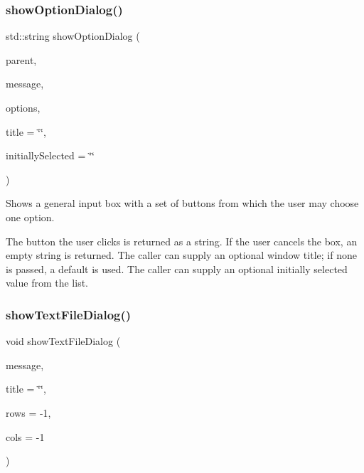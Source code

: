\subsubsection{\texorpdfstring{show\+Option\+Dialog()}{showOptionDialog()}\hspace{0.1cm}{\footnotesize\ttfamily [3/3]}}
{\footnotesize\ttfamily std\+::string show\+Option\+Dialog (\begin{DoxyParamCaption}\item[{Q\+Widget $\ast$}]{parent,  }\item[{const std\+::string \&}]{message,  }\item[{const \mbox{\hyperlink{classVector}{Vector}}$<$ std\+::string $>$ \&}]{options,  }\item[{const std\+::string \&}]{title = {\ttfamily \char`\"{}\char`\"{}},  }\item[{const std\+::string \&}]{initially\+Selected = {\ttfamily \char`\"{}\char`\"{}} }\end{DoxyParamCaption})\hspace{0.3cm}{\ttfamily [static]}}



Shows a general input box with a set of buttons from which the user may choose one option. 

The button the user clicks is returned as a string. If the user cancels the box, an empty string is returned. The caller can supply an optional window title; if none is passed, a default is used. The caller can supply an optional initially selected value from the list. \mbox{\label{classGOptionPane_ac23d3f6bc00fb83d71f7168bfe162abf}} 
\subsubsection{\texorpdfstring{show\+Text\+File\+Dialog()}{showTextFileDialog()}\hspace{0.1cm}{\footnotesize\ttfamily [1/3]}}
{\footnotesize\ttfamily void show\+Text\+File\+Dialog (\begin{DoxyParamCaption}\item[{const std\+::string \&}]{message,  }\item[{const std\+::string \&}]{title = {\ttfamily \char`\"{}\char`\"{}},  }\item[{int}]{rows = {\ttfamily -\/1},  }\item[{int}]{cols = {\ttfamily -\/1} }\end{DoxyParamCaption})\hspace{0.3cm}{\ttfamily [static]}}




